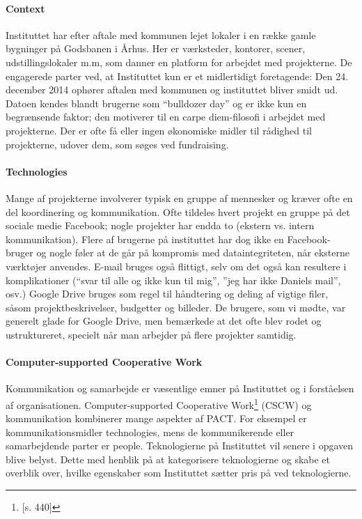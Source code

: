 \paragraph{Context}
Instituttet har efter aftale med kommunen lejet lokaler i en række gamle bygninger på Godsbanen i Århus. Her er værksteder, kontorer, scener, udstillingslokaler m.m, som danner en platform for arbejdet med projekterne.
De engagerede parter ved, at Instituttet kun er et midlertidigt foretagende: Den
24. december 2014 ophører aftalen med kommunen og instituttet bliver smidt ud. Datoen kendes blandt brugerne som “bulldozer day” og er ikke kun en begrænsende faktor; den motiverer til en carpe diem-filosofi i arbejdet med projekterne.
Der er ofte få eller ingen økonomiske midler til rådighed til projekterne, udover dem, som søges ved fundraising.

\paragraph{Technologies}
Mange af projekterne involverer typisk en gruppe af mennesker og kræver ofte en del koordinering og kommunikation. Ofte tildeles hvert projekt en gruppe på det sociale medie Facebook; nogle projekter har endda to (ekstern vs. intern kommunikation). Flere af brugerne på instituttet har dog ikke en Facebook-bruger og nogle føler at de går på kompromis med dataintegriteten, når eksterne værktøjer anvendes.
E-mail bruges også flittigt, selv om det også kan resultere i komplikationer (“svar til alle og ikke kun til mig”, ”jeg har ikke Daniels mail”, osv.)
Google Drive bruges som regel til håndtering og deling af vigtige filer, såsom projektbeskrivelser, budgetter og billeder. De brugere, som vi mødte, var generelt glade for Google Drive, men bemærkede at det ofte blev rodet og ustruktureret, specielt når man arbejder på flere projekter samtidig.

\paragraph{Computer-supported Cooperative Work}
Kommunikation og samarbejde er væsentlige emner på Instituttet og i forståelsen af organisationen. Computer-supported Cooperative Work\footnote{\citep{Benyon}[s. 440]} (CSCW) og kommunikation kombinerer mange aspekter af PACT. For eksempel er kommunikationsmidler technologies, mens de kommunikerende eller samarbejdende parter er people. Teknologierne på Instituttet vil senere i opgaven blive belyst. Dette med henblik på at kategorisere teknologierne og skabe et overblik over, hvilke egenskaber som Instituttet sætter pris på ved teknologierne.
 
